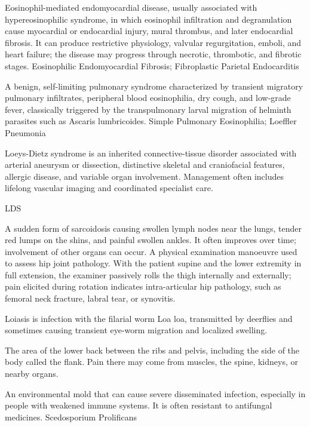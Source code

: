  Eosinophil-mediated endomyocardial disease, usually associated with hypereosinophilic syndrome, in which eosinophil infiltration and degranulation cause myocardial or endocardial injury, mural thrombus, and later endocardial fibrosis. It can produce restrictive physiology, valvular regurgitation, emboli, and heart failure; the disease may progress through necrotic, thrombotic, and fibrotic stages.
\synonyms
Eosinophilic Endomyocardial Fibrosis; Fibroplastic Parietal Endocarditis

 A benign, self-limiting pulmonary syndrome characterized by transient migratory pulmonary infiltrates, peripheral blood eosinophilia, dry cough, and low-grade fever, classically triggered by the transpulmonary larval migration of helminth parasites such as Ascaris lumbricoides.
\synonyms
Simple Pulmonary Eosinophilia; Loeffler Pneumonia

 Loeys-Dietz syndrome is an inherited connective-tissue disorder associated with arterial aneurysm or dissection, distinctive skeletal and craniofacial features, allergic disease, and variable organ involvement. Management often includes lifelong vascular imaging and coordinated specialist care.

\synonyms
LDS

 A sudden form of sarcoidosis causing swollen lymph nodes near the lungs, tender red lumps on the shins, and painful swollen ankles. It often improves over time; involvement of other organs can occur.
 A physical examination manoeuvre used to assess hip joint pathology. With the patient supine and the lower extremity in full extension, the examiner passively rolls the thigh internally and externally; pain elicited during rotation indicates intra-articular hip pathology, such as femoral neck fracture, labral tear, or synovitis.

 Loiasis is infection with the filarial worm Loa loa, transmitted by deerflies and sometimes causing transient eye-worm migration and localized swelling.

 The area of the lower back between the ribs and pelvis, including the side of the body called the flank. Pain there may come from muscles, the spine, kidneys, or nearby organs.

 An environmental mold that can cause severe disseminated infection, especially in people with weakened immune systems. It is often resistant to antifungal medicines.
\synonyms
Scedosporium Prolificans


